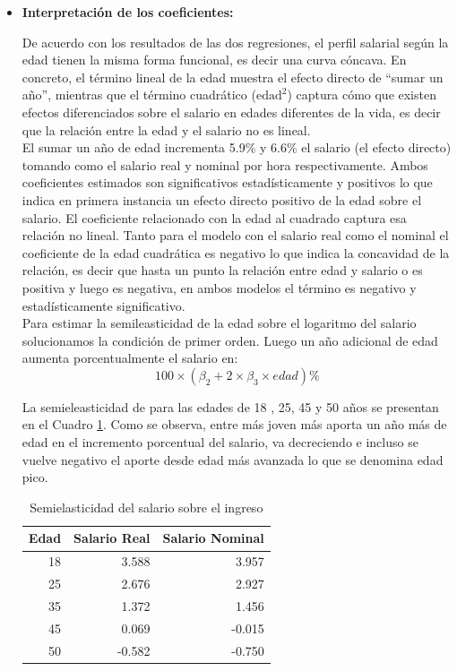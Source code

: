 \documentclass[12pt,a4paper,onecolumn]{article}
\begin{document}
\begin{itemize}
\item \textbf{Interpretación de los coeficientes:}

De acuerdo con los resultados de las dos regresiones, el perfil salarial según la edad tienen la misma forma funcional, es decir una curva cóncava. En concreto, el término lineal de la edad muestra el efecto directo de “sumar un año”, mientras que el término cuadrático ($\text{edad}^2$) captura cómo que existen efectos diferenciados sobre el salario en edades diferentes de la vida, es decir que la relación entre la edad y el salario no es lineal.\\

El sumar un año de edad incrementa 5.9\% y 6.6\% el salario (el efecto directo) tomando como el salario real y nominal por hora respectivamente. Ambos coeficientes estimados son significativos estadísticamente y positivos lo que indica en primera instancia un efecto directo positivo de la edad sobre el salario. El coeficiente relacionado con la edad al cuadrado captura esa relación no lineal. Tanto para el modelo con el salario real como el nominal el coeficiente de la edad cuadrática es negativo lo que indica la concavidad de la relación, es decir que hasta un punto la relación entre edad y salario o es positiva y luego es negativa, en ambos modelos el término es negativo y estadísticamente significativo.\\ 

 Para estimar la semileasticidad de la edad sobre el logaritmo del salario solucionamos la condición de primer orden. Luego un año adicional de edad aumenta porcentualmente el salario en:
\begin{equation*}
	100 \times (\beta_2+ 2 \times \beta_3\times edad) \%
\end{equation*}

La semieleasticidad de para las edades de 18 , 25, 45 y 50 años se presentan en el Cuadro \ref{3_semielastic}. Como se observa, entre más joven más aporta un año más de edad en el incremento porcentual del salario, va decreciendo e incluso se vuelve negativo el aporte desde edad más avanzada lo que se denomina edad pico. 

\begin{table}[ht]
\centering
\caption{Semielasticidad del salario sobre el ingreso}
\label{3_semielastic}
\small
\begin{tabular}{rrr}
  \hline
Edad & Salario Real & Salario Nominal \\ 
  \hline
18 & 3.588 & 3.957 \\ 
  25 & 2.676 & 2.927 \\ 
  35 & 1.372 & 1.456 \\ 
  45 & 0.069 & -0.015 \\ 
  50 & -0.582 & -0.750 \\ 
   \hline
\end{tabular}
\end{table}
 

\end{itemize}
\end{document}
